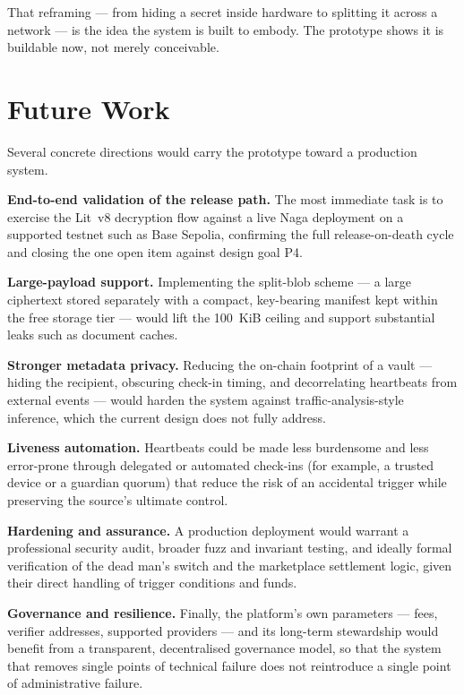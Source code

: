 That reframing --- from hiding a secret inside hardware to splitting it across a
network --- is the idea the system is built to embody. The prototype shows it is
buildable now, not merely conceivable.

\section{Future Work}
\label{sec:concl-future}

Several concrete directions would carry the prototype toward a production system.

\textbf{End-to-end validation of the release path.} The most immediate task is to
exercise the Lit~v8 decryption flow against a live Naga deployment on a supported
testnet such as Base Sepolia, confirming the full release-on-death cycle and
closing the one open item against design goal P4.

\textbf{Large-payload support.} Implementing the split-blob scheme --- a large
ciphertext stored separately with a compact, key-bearing manifest kept within the
free storage tier --- would lift the 100~KiB ceiling and support substantial leaks
such as document caches.

\textbf{Stronger metadata privacy.} Reducing the on-chain footprint of a vault ---
hiding the recipient, obscuring check-in timing, and decorrelating heartbeats from
external events --- would harden the system against traffic-analysis-style inference,
which the current design does not fully address.

\textbf{Liveness automation.} Heartbeats could be made less burdensome and less
error-prone through delegated or automated check-ins (for example, a trusted device
or a guardian quorum) that reduce the risk of an accidental trigger while
preserving the source's ultimate control.

\textbf{Hardening and assurance.} A production deployment would warrant a
professional security audit, broader fuzz and invariant testing, and ideally formal
verification of the dead man's switch and the marketplace settlement logic, given
their direct handling of trigger conditions and funds.

\textbf{Governance and resilience.} Finally, the platform's own parameters --- fees,
verifier addresses, supported providers --- and its long-term stewardship would
benefit from a transparent, decentralised governance model, so that the system that
removes single points of technical failure does not reintroduce a single point of
administrative failure.

